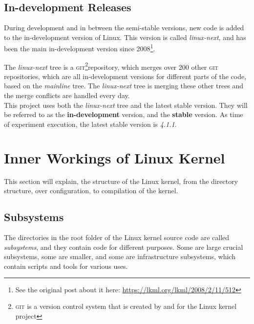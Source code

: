 \documentclass[a4paper,11pt]{report}
\newcommand{\f}{\footnote{\fn}}
\newcommand{\figa}{
    \begin{figure}[!htpb]
    \centering
}
\newcommand{\figb}[2]{
    \caption{#1}
    \label{#2}
    \end{figure}
}
\begin{document}
            \subsection*{In-development Releases}

            \def \fn {See the original post about it here: 
            \url{https://lkml.org/lkml/2008/2/11/512}}

During development and in between the semi-stable versions, new code is added to the in-development version of Linux.
This version is called \emph{linux-next}, and has been the main in-development version
since 2008\f.
\\

            \def \fn {\textsc{git} is a version control system that is created
            by and for the Linux kernel project}

The \emph{linux-next} tree is a \textsc{git}\f repository, which merges over 200 
other \textsc{git} repositories\cite {nextTrees}, which are all in-development versions for different parts of the code, based on the 
\emph{mainline} tree. The \emph{linux-next} tree is merging these other trees 
and the merge conflicts are handled every day.
\\

This project uses both the \emph{linux-next} tree and the latest stable 
version. They will be referred to as the \textbf{in-development} 
version, and the \textbf{stable} version. As time of experiment execution, the 
latest stable version is \emph{4.1.1}.


    \section{Inner Workings of Linux Kernel}

This section will explain, the structure of the Linux kernel, from the 
directory structure, over configuration, to compilation of the kernel.


            \subsection{Subsystems}
            \label{sec:linuxss}

The directories in the root folder of the Linux kernel source code are called 
\emph{subsystems}, and they contain code for different purposes. Some are large 
crucial subsystems, some are smaller, and some are infrastructure 
subsystems, which contain scripts and tools for various uses\cite{42bugs}.
\\
\end{document}
